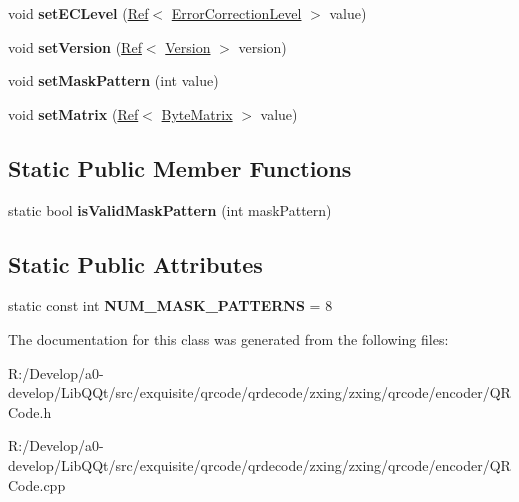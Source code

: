 \begin{DoxyCompactItemize}
void {\bfseries set\+E\+C\+Level} (\mbox{\hyperlink{classzxing_1_1_ref}{Ref}}$<$ \mbox{\hyperlink{classzxing_1_1qrcode_1_1_error_correction_level}{Error\+Correction\+Level}} $>$ value)
\item 
\mbox{\label{classzxing_1_1qrcode_1_1_q_r_code_a99ce1f9053321c395c310349ac9198df}} 
void {\bfseries set\+Version} (\mbox{\hyperlink{classzxing_1_1_ref}{Ref}}$<$ \mbox{\hyperlink{classzxing_1_1qrcode_1_1_version}{Version}} $>$ version)
\item 
\mbox{\label{classzxing_1_1qrcode_1_1_q_r_code_a704b86dc6c378f3d53d81fd47ebd665d}} 
void {\bfseries set\+Mask\+Pattern} (int value)
\item 
\mbox{\label{classzxing_1_1qrcode_1_1_q_r_code_a39cbf77fa19562fab98839aadced893c}} 
void {\bfseries set\+Matrix} (\mbox{\hyperlink{classzxing_1_1_ref}{Ref}}$<$ \mbox{\hyperlink{classzxing_1_1qrcode_1_1_byte_matrix}{Byte\+Matrix}} $>$ value)
\end{DoxyCompactItemize}
\subsection*{Static Public Member Functions}
\begin{DoxyCompactItemize}
\item 
\mbox{\label{classzxing_1_1qrcode_1_1_q_r_code_a73a5ebad52e45bea2c8f1b97a72f0092}} 
static bool {\bfseries is\+Valid\+Mask\+Pattern} (int mask\+Pattern)
\end{DoxyCompactItemize}
\subsection*{Static Public Attributes}
\begin{DoxyCompactItemize}
\item 
\mbox{\label{classzxing_1_1qrcode_1_1_q_r_code_aa70d4d47b6263d8543d572d388ddaa30}} 
static const int {\bfseries N\+U\+M\+\_\+\+M\+A\+S\+K\+\_\+\+P\+A\+T\+T\+E\+R\+NS} = 8
\end{DoxyCompactItemize}


The documentation for this class was generated from the following files\+:\begin{DoxyCompactItemize}
\item 
R\+:/\+Develop/a0-\/develop/\+Lib\+Q\+Qt/src/exquisite/qrcode/qrdecode/zxing/zxing/qrcode/encoder/Q\+R\+Code.\+h\item 
R\+:/\+Develop/a0-\/develop/\+Lib\+Q\+Qt/src/exquisite/qrcode/qrdecode/zxing/zxing/qrcode/encoder/Q\+R\+Code.\+cpp\end{DoxyCompactItemize}
